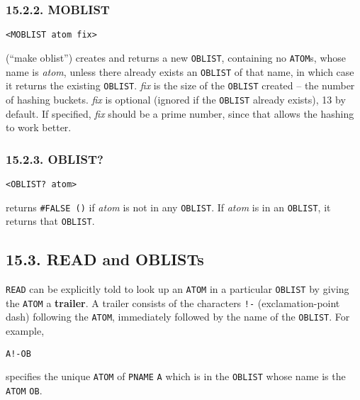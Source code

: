 \documentclass[a4paper,]{article}
\begin{document}
\subsubsection{15.2.2. MOBLIST}\label{moblist}

\begin{verbatim}
<MOBLIST atom fix>
\end{verbatim}

 (``make oblist'') creates and returns a new \texttt{OBLIST}, containing no \texttt{ATOM}s,
whose name is \emph{atom}, unless there already exists an \texttt{OBLIST} of that name, in which case it returns the
existing \texttt{OBLIST}. \emph{fix} is the size of the \texttt{OBLIST} created -- the number of hashing buckets.
\emph{fix} is optional (ignored if the \texttt{OBLIST} already exists), 13 by default. If specified, \emph{fix} should be a
prime number, since that allows the hashing to work better.

\subsubsection{15.2.3. OBLIST?}\label{oblist}

\begin{verbatim}
<OBLIST? atom>
\end{verbatim}

 returns \texttt{\#FALSE\ ()} if \emph{atom} is not in any \texttt{OBLIST}. If \emph{atom}
is in an \texttt{OBLIST}, it returns that \texttt{OBLIST}.

\subsection{15.3. READ and OBLISTs}\label{read-and-oblists}

\texttt{READ} can be explicitly told to look up an \texttt{ATOM} in a particular \texttt{OBLIST} by
giving the \texttt{ATOM} a \textbf{trailer}. A trailer consists of the characters \texttt{!-} 
(exclamation-point dash) following the \texttt{ATOM}, immediately followed by the name of the \texttt{OBLIST}. For example,

\begin{verbatim}
A!-OB
\end{verbatim}

specifies the unique \texttt{ATOM} of \texttt{PNAME} \texttt{A} which is in the \texttt{OBLIST} whose name is the
\texttt{ATOM} \texttt{OB}.
\end{document}
